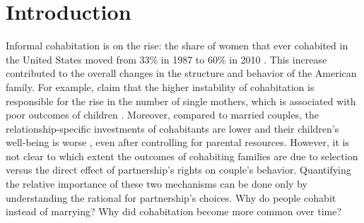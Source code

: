 \documentclass[12pt]{article}
\numberwithin{table}{section}
\begin{document}
\clearpage
\section{Introduction}



Informal cohabitation is on the rise: the share of women that ever cohabited in the United States moved from 33\% in 1987 to 60\% in 2010 \citep{manning2013}. This increase contributed to the overall changes in the structure and behavior of the American family. For example, \cite{bumpass2000} claim that the higher instability of cohabitation is responsible for the rise in the number of single mothers, which is associated with poor outcomes of children \citep{chetty2018,mclanahan2013}. Moreover, compared to married couples, the relationship-specific investments of cohabitants are lower \citep{poortman2012} and their children's well-being is worse \citep{brown2004}, even after controlling for parental resources. However, it is not clear to which extent the outcomes of cohabiting families are due to selection versus the direct effect of partnership's rights on couple's behavior. Quantifying the relative importance of these two mechanisms can be done only by understanding the rational for partnership's choices. Why do people cohabit instead of marrying? Why did cohabitation become more common over time?
\end{document}
